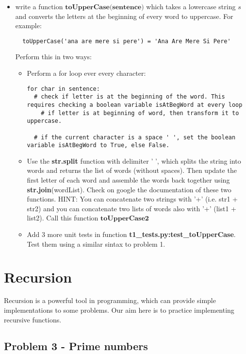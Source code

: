 \documentclass[11pt,a4paper]{report}
\begin{document}
\begin{itemize}
  \item write a function $\textbf{toUpperCase(sentence)}$ which takes a lowercase string $s$ and converts the letters at the beginning of every word to uppercase. For example: 
  \begin{lstlisting}
  toUpperCase('ana are mere si pere') = 'Ana Are Mere Si Pere'
  \end{lstlisting}   
  Perform this in two ways:
  \begin{itemize}
   \item Perform a for loop ever every character:
     \begin{lstlisting}
for char in sentence:
  # check if letter is at the beginning of the word. This requires checking a boolean variable isAtBegWord at every loop
    # if letter is at beginning of word, then transform it to uppercase. 
    
  # if the current character is a space ' ', set the boolean variable isAtBegWord to True, else False.
  \end{lstlisting}  
  \item Use the \textbf{str.split} function with delimiter ' ', which splits the string into words and returns the list of words (without spaces). Then update the first letter of each word and assemble the words back together using \textbf{str.join}(wordList). Check on google the documentation of these two functions. HINT: You can concatenate two strings with '+' (i.e. str1 + str2) and you can concatenate two lists of words also with '+' (list1 + list2). Call this function $\textbf{toUpperCase2}$
  \item Add 3 more unit tests in function \textbf{t1\_tests.py:test\_toUpperCase}. Test them using a similar sintax to problem 1.
  \end{itemize}


\end{itemize}


\section*{Recursion}

Recursion is a powerful tool in programming, which can provide simple implementations to some problems. Our aim here is to practice implementing recursive functions.


\subsection*{Problem 3 - Prime numbers}
\end{document}

